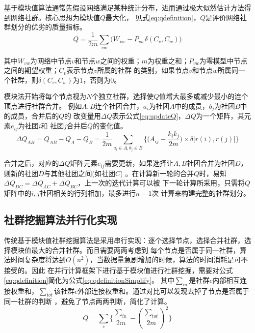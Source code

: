 基于模块值算法通常先假设网络满足某种统计分布，进而通过极大似然估计方法得到网络社群。核心思想为模块值$Q$最大化，
见式\eqref{eq:qdefinition}，$Q$是评价网络社群划分的优劣的质量指标。
\begin{equation}
\label{eq:qdefinition}
Q=\frac{1}{2m}\displaystyle{\sum_{vw}\big(W_{vw}-P_{vw}\delta(C_v,C_w)\big)}
\end{equation}

其中$W_{vw}$为网络中节点$v$和节点$w$之间的权重；$m$为权重之和；$P_{vw}$为零模型中节点之间的期望权重；$C_v$表示节点$v$所属的社群
的类别，如果节点$v$和节点$w$所属同一个社群，则$\delta(C_v,C_w)$为1，否则为0。

模块法开始将每个节点视为$N$个独立社群，选择使$Q$值增大最多或减少最小的连个顶点进行社群合并。
例如$A,B$连个社团合并，$a_i$为社团$A$中的成员，$b_j$为社团$B$中的成员，合并后的$Q$的
改变量用$\Delta Q$表示公式\eqref{eq:updateQ}，$\Delta Q$为一个矩阵，其元素$e_{ij}$为社团$i$和
社团$j$合并后$Q$的变化值。%
\begin{equation}
\label{eq:updateQ}
\Delta Q_{AB}=Q_{AB}-Q_{A}-Q_{B}=\frac{1}{2m}\displaystyle{\sum_{a_i \in A, b_j \in B}}\bigg\{ \big( A_{ij} - \frac{k_ik_j}{2m} 
   \big) \times \delta \big[ r(i),r(j) \big] \bigg\}
\end{equation}

合并之后，对应的$\Delta Q$矩阵元素$e_{ij}$需要更新，如果选择让$A,B$社团合并为社团$D$，则新的社团$D$与其他社团之间(如社团$C$)
。在计算新一轮的合并$Q$时，易知$\Delta Q_{DC}=\Delta Q_{AC}+\Delta Q_{BC}$，上一次的迭代计算可以被
下一轮计算所采用，只需将$Q$矩阵中的$i,j$社团相关的行列相加，最多进行$n-1$次
计算来构建完整的社群划分\cite{Newman2012Communities}。

\subsection{社群挖掘算法并行化实现}

传统基于模块值社群挖掘算法是采用串行实现：逐个选择节点，选择合并社群，选择模块值最大的合并社群。而且需要两两考虑到
每个节点是否属于同一社群，算法时间复杂度将达到$O(n^2)$，当数据量急剧增加的时候，算法的时间消耗是可不接受的。因此
在并行计算框架下进行基于模块值进行社群挖掘，需要对公式\eqref{eq:qdefinition}简化为公式\eqref{eq:qdefinitionSimplify}。
其中$\sum_{in}$是社群$c$内部相互连接权重和，$\sum_{tot}$该社群$c$外部连接权重和。通过对比可以发现去掉了节点是否属于同一社群的判断
，避免了节点两两判断，简化了计算\cite{Blondel2008Fast}。
\begin{equation}
\label{eq:qdefinitionSimplify}
Q=\sum_{c}\big\{\frac{\sum_{in}}{2m} - (\frac{\sum_{tot}}{2m})^2\big\}
\end{equation}

